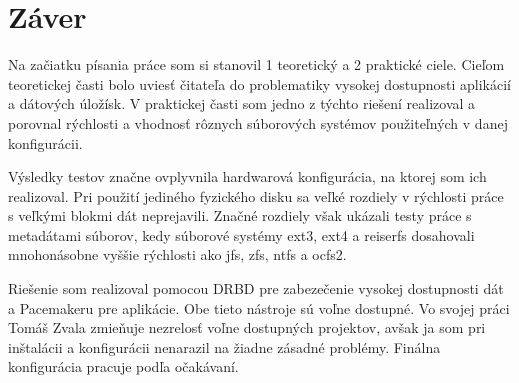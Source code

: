 \chapter*{Záver}

Na začiatku písania práce som si stanovil 1 teoretický a 2 praktické ciele. Cieľom teoretickej časti bolo uviesť čitateľa do problematiky vysokej dostupnosti aplikácií a dátových úložísk. V praktickej časti som jedno z týchto riešení realizoval a porovnal rýchlosti a vhodnosť rôznych súborových systémov použiteľných v danej konfigurácii.

Výsledky testov značne ovplyvnila hardwarová konfigurácia, na ktorej som ich realizoval. Pri použití jediného fyzického disku sa veľké rozdiely v rýchlosti práce s veľkými blokmi dát neprejavili. Značné rozdiely však ukázali testy práce s metadátami súborov, kedy súborové systémy ext3, ext4 a reiserfs dosahovali mnohonásobne vyššie rýchlosti ako jfs, zfs, ntfs a ocfs2.

Riešenie som realizoval pomocou DRBD pre zabezečenie vysokej dostupnosti dát a Pacemakeru pre aplikácie. Obe tieto nástroje sú voľne dostupné. Vo svojej práci Tomáš Zvala zmieňuje nezrelosť voľne dostupných projektov, avšak ja som pri inštalácii a konfigurácii nenarazil na žiadne zásadné problémy. Finálna konfigurácia pracuje podľa očakávaní.

\emptydoublepage
